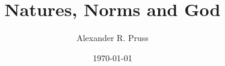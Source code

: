 \def\book{}



\title{Natures, Norms and God}
\author{Alexander R. Pruss}
\date{\today}


\maketitle

\setcounter{secnumdepth}{4}
\setcounter{tocdepth}{4}
\tableofcontents





\printbibliography

